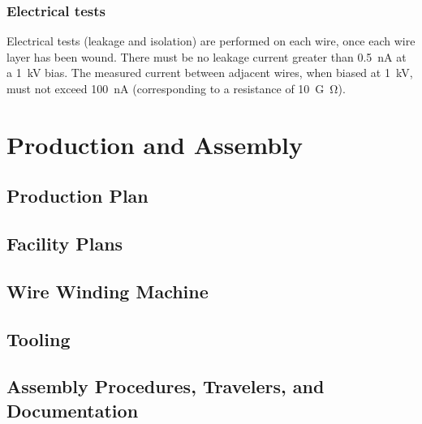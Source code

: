 \subsubsection{Electrical tests}

Electrical tests (leakage and isolation) are performed on each wire, once each wire layer has been wound. There must be no leakage current greater than \SI{0.5}{nA} at a \SI{1}{kV} bias. The measured current between adjacent wires, when biased at \SI{1}{kV}, must not exceed \SI{100}{nA} (corresponding to a resistance of \SI{10}{G\ohm}).



\section{Production and Assembly}
\label{sec:fdsp-apa-prod-assy}


\subsection{Production Plan}
\label{sec:fdsp-apa-prod-plan}


\subsection{Facility Plans}
\label{sec:fdsp-apa-facility}


\subsection{Wire Winding Machine}
\label{sec:fdsp-apa-winding}


\subsection{Tooling}
\label{sec:fdsp-apa-tooling}


\subsection{Assembly Procedures, Travelers, and Documentation}
\label{sec:fdsp-apa-assy}




